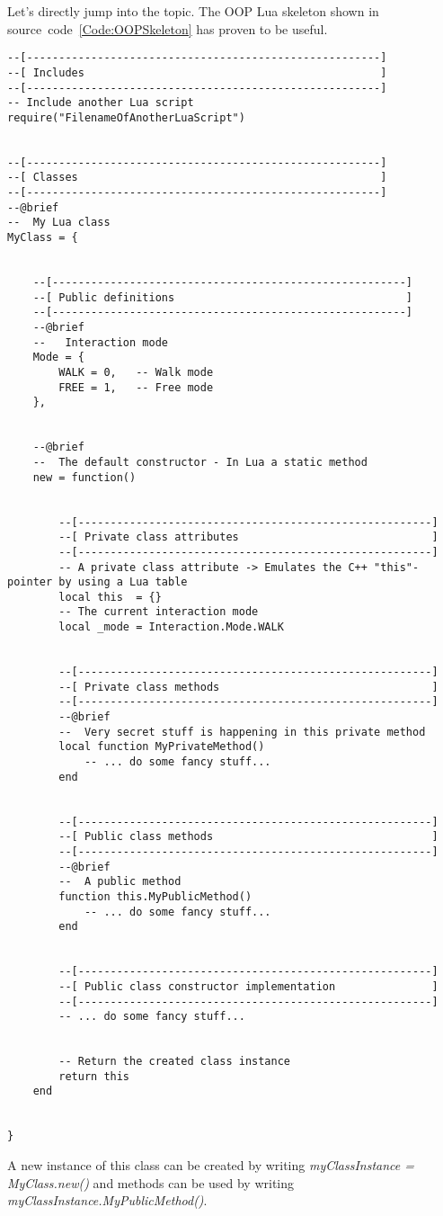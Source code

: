 Let's directly jump into the topic. The OOP Lua skeleton shown in source~code~\ref{Code:OOPSkeleton} has proven to be useful.
\begin{lstlisting}[label=Code:OOPSkeleton,caption={Object-oriented programming (OOP) Lua skeleton}]
--[-------------------------------------------------------]
--[ Includes                                              ]
--[-------------------------------------------------------]
-- Include another Lua script
require("FilenameOfAnotherLuaScript")


--[-------------------------------------------------------]
--[ Classes                                               ]
--[-------------------------------------------------------]
--@brief
--  My Lua class
MyClass = {


	--[-------------------------------------------------------]
	--[ Public definitions                                    ]
	--[-------------------------------------------------------]
	--@brief
	--   Interaction mode
	Mode = {
		WALK = 0,	-- Walk mode
		FREE = 1,	-- Free mode
	},


	--@brief
	--  The default constructor - In Lua a static method
	new = function()


		--[-------------------------------------------------------]
		--[ Private class attributes                              ]
		--[-------------------------------------------------------]
		-- A private class attribute -> Emulates the C++ "this"-pointer by using a Lua table
		local this	= {}
		-- The current interaction mode
		local _mode	= Interaction.Mode.WALK


		--[-------------------------------------------------------]
		--[ Private class methods                                 ]
		--[-------------------------------------------------------]
		--@brief
		--  Very secret stuff is happening in this private method
		local function MyPrivateMethod()
			-- ... do some fancy stuff...
		end


		--[-------------------------------------------------------]
		--[ Public class methods                                  ]
		--[-------------------------------------------------------]
		--@brief
		--  A public method
		function this.MyPublicMethod()
			-- ... do some fancy stuff...
		end


		--[-------------------------------------------------------]
		--[ Public class constructor implementation               ]
		--[-------------------------------------------------------]
		-- ... do some fancy stuff...


		-- Return the created class instance
		return this
	end


}
\end{lstlisting}
A new instance of this class can be created by writing \emph{myClassInstance = MyClass.new()} and methods can be used by writing \emph{myClassInstance.MyPublicMethod()}.

